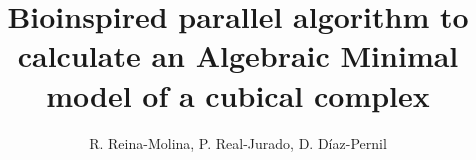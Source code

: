 \documentclass{article}
\begin{document}
\title{Bioinspired parallel algorithm to calculate an Algebraic Minimal model of a cubical complex}
\author{R. Reina-Molina, P. Real-Jurado, D. Díaz-Pernil}
\maketitle
















\end{document}
